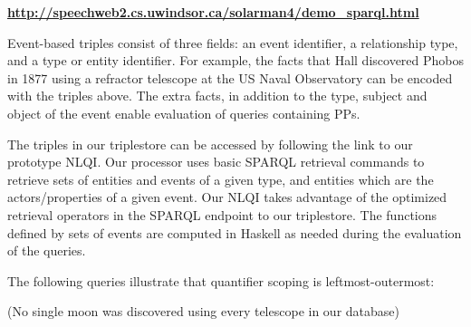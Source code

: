 \documentclass[../main.tex]{subfiles}
\begin{document}
\begin{refsection}

\begin{center}
	\textbf{\url{http://speechweb2.cs.uwindsor.ca/solarman4/demo_sparql.html}}
\end{center}


Event-based triples consist of three fields: an event identifier, a relationship type, and a type or
entity identifier. For example, the facts that Hall discovered Phobos in 1877 using a refractor
telescope at the US Naval Observatory can be encoded with the triples above.
The extra facts, in addition to the type, subject and object of the event enable evaluation of queries containing PPs.

The triples in our triplestore can be accessed by following the link to our prototype NLQI.
Our processor uses basic SPARQL retrieval commands to retrieve sets of entities and events of a given
type, and entities which are the actors/properties of a given event. Our NLQI takes
advantage of the optimized retrieval operators in the SPARQL endpoint to our triplestore. The
functions defined by sets of events are computed in Haskell as needed during the evaluation of the
queries.

The following queries illustrate that quantifier scoping is leftmost-outermost:

\examplespacing


 (No single moon was discovered using every telescope in our database)





\end{refsection}
\end{document}
